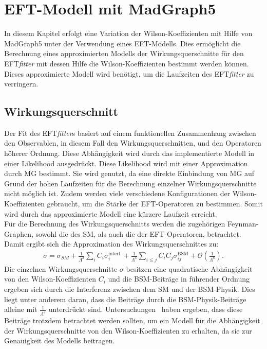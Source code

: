 \chapter{EFT-Modell mit MadGraph5}
In diesem Kapitel erfolgt eine Variation der Wilson-Koeffizienten mit Hilfe  von MadGraph5 unter der Verwendung eines EFT-Modells. Dies ermöglicht die Berechnung eines approximierten Modells der Wirkungsquerschnitte für den EFT\textit{fitter} mit dessen Hilfe die Wilson-Koeffizienten bestimmt werden können. Dieses approximierte Modell wird benötigt, um die Laufzeiten des EFT\textit{fitter} zu verringern.

\section{Wirkungsquerschnitt}
Der Fit des EFT\textit{fitter}s basiert auf einem funktionellen Zusammenhang zwischen den Observablen, in diesem Fall den Wirkungsquerschnitten, und den Operatoren höherer Ordnung. Diese Abhängigkeit wird durch das implementierte Modell in einer Likelihood ausgedrückt. Diese Likelihood wird mit einer Approximation durch MG bestimmt. Sie wird genutzt, da eine direkte Einbindung von MG auf Grund der hohen Laufzeiten für die Berechnung einzelner Wirkungsquerschnitte nicht möglich ist. Zudem werden viele verschiedene Konfigurationen der Wilson-Koeffizienten gebraucht, um die Stärke der EFT-Operatoren zu bestimmen. Somit wird durch das approximierte Modell eine kürzere Laufzeit erreicht.\\
Für die Berechnung des Wirkungsquerschnitts werden die zugehörigen Feynman-Graphen, sowohl die des SM, als auch die der EFT-Operatoren, betrachtet. Damit ergibt sich die Approximation des Wirkungsquerschnittes zu:
\begin{align}
  \sigma = \sigma_{SM} + \frac{1}{\Lambda^2} \sum_{i} C_i \sigma_i^\text{interf.} + \frac{1}{\Lambda^4} \sum_{i \leq j} C_i C_j \sigma_{ij}^\text{BSM} + \mathcal{O} \left(\frac{1}{\Lambda^6}\right).
\end{align}
Die einzelnen Wirkungsquerschnitte $\sigma$ besitzen eine quadratische Abhängigkeit von den Wilson-Koeffizienten $C_i$ und die BSM-Beiträge in führender Ordnung ergeben sich durch die Interferenz zwischen dem SM und der BSM-Physik. Dies liegt unter anderem daran, dass die Beiträge durch die BSM-Physik-Beiträge alleine mit $\frac{1}{\Lambda^4}$ unterdrückt sind. Untersuchungen~\cite{Fichet:2016iuo} haben ergeben, dass diese Beiträge trotzdem betrachtet werden sollten, um ein Modell für die Abhängigkeit der Wirkungsquerschnitte von den Wilson-Koeffizienten zu erhalten, da sie zur Genauigkeit des Modells beitragen.

